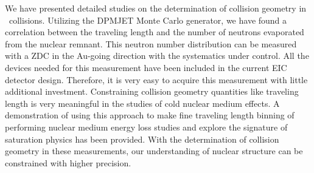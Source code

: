 We have presented detailed studies on the determination of collision geometry
in \eA\ collisions. Utilizing the DPMJET Monte Carlo generator, we have found a
correlation between the traveling length and the number of neutrons evaporated
from the nuclear remnant. This neutron number distribution can be measured with
a ZDC in the Au-going direction with the systematics under control. All the
devices needed for this measurement have been included in the current EIC
detector design. Therefore, it is very easy to acquire this measurement
with little additional investment. Constraining collision geometry
quantities like traveling length is very meaningful in the studies of cold
nuclear medium effects. A demonstration of using this approach to make
fine traveling length binning of performing nuclear medium energy loss studies
and explore the signature of saturation physics has been provided. With the
determination of collision geometry in these measurements, our understanding of 
nuclear structure can be constrained with higher precision.


